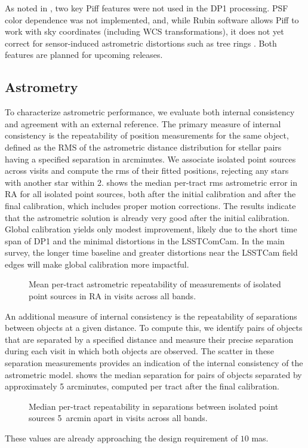 As noted in  \cite{PSTN-019}, two key Piff features were not used in the DP1 processing.
PSF color dependence was not implemented, and, while Rubin software allows Piff to work with sky coordinates (including WCS transformations), 
it does not yet correct for sensor-induced astrometric distortions such as tree rings \citep{2017JInst..12C5015P}.
Both features are planned for upcoming releases.

\subsection{Astrometry}
To characterize astrometric performance, we evaluate both internal consistency and agreement with an external reference.
The primary measure of internal consistency is the repeatability of position measurements for the same object, defined as the RMS of the astrometric distance distribution for 
stellar pairs having a specified separation in arcminutes. 
We associate isolated point sources across visits and compute the rms of their fitted positions, rejecting any stars with another star within  2\arcsec.
 shows the median per-\gls{tract} rms astrometric error in RA  for all isolated point sources, both after the initial calibration and after the final calibration, which includes proper motion corrections.
The results indicate that the astrometric solution is already very good after the initial \gls{calibration}.
Global calibration yields only modest improvement, likely due to the short time span of \gls{DP1} and the minimal distortions in the LSSTComCam.
In the main survey, the longer time baseline and greater distortions near the \gls{LSSTCam} field edges will make global calibration more impactful.
\begin{figure}[htb!]
\caption{Mean per-tract astrometric repeatability of measurements of isolated point sources in RA in visits across all bands.}
\label{fig:dmAstroErr}
\end{figure}
An additional measure of internal consistency is the repeatability of separations between objects at a given distance.
To compute this, we identify pairs of objects that are separated by a specified distance and measure their precise separation during each visit in which both objects are observed.
The scatter in these separation measurements provides an indication of the internal consistency of the astrometric model.
 shows the median separation for pairs of objects separated by approximately 5 arcminutes, computed per tract after the final calibration.
\begin{figure}[htb!]
 \caption{Median per-tract repeatability in separations between isolated point sources 5~arcmin apart in visits across all bands.}
 \label{fig:AM1}
 \end{figure}
These values are already approaching the design requirement of $10$ mas.

